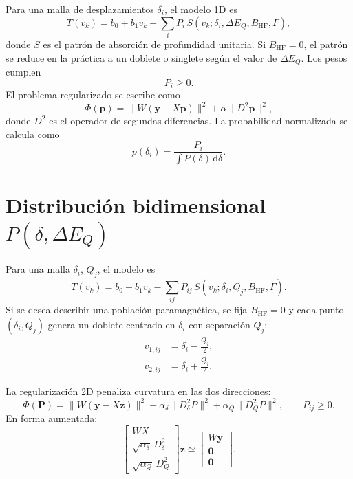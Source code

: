 \documentclass[11pt,a4paper]{article}
\newcommand{\IS}{\delta}
\newcommand{\QS}{\Delta E_Q}
\newcommand{\BHF}{B_{\mathrm{HF}}}
\newcommand{\dd}{\mathrm{d}}
\begin{document}
Para una malla de desplazamientos $\IS_i$, el modelo 1D es
\begin{equation}
  T(v_k)=b_0+b_1v_k-\sum_i P_i\,S(v_k;\IS_i,\QS,\BHF,\Gamma),
\end{equation}
donde $S$ es el patrón de absorción de profundidad unitaria. Si $\BHF=0$, el
patrón se reduce en la práctica a un doblete o singlete según el valor de $\QS$.
Los pesos cumplen
\begin{equation}
  P_i\ge0.
\end{equation}
El problema regularizado se escribe como
\begin{equation}
  \Phi(\bm p)=\|W(\bm y-X\bm p)\|^2+\alpha\|D^2\bm p\|^2,
\end{equation}
donde $D^2$ es el operador de segundas diferencias. La probabilidad normalizada
se calcula como
\begin{equation}
  p(\IS_i)=\frac{P_i}{\int P(\IS)\,\dd\IS}.
\end{equation}

\section{Distribución bidimensional $P(\IS,\QS)$}

Para una malla $\IS_i$, $Q_j$, el modelo es
\begin{equation}
  T(v_k)=b_0+b_1v_k-\sum_{ij}P_{ij}\,
  S(v_k;\IS_i,Q_j,\BHF,\Gamma).
\end{equation}
Si se desea describir una población paramagnética, se fija $\BHF=0$ y cada punto
$(\IS_i,Q_j)$ genera un doblete centrado en $\IS_i$ con separación $Q_j$:
\begin{align}
  v_{1,ij}&=\IS_i-\frac{Q_j}{2},\\
  v_{2,ij}&=\IS_i+\frac{Q_j}{2}.
\end{align}

La regularización 2D penaliza curvatura en las dos direcciones:
\begin{equation}
  \Phi(\bm P)=\|W(\bm y-X\bm z)\|^2
  +\alpha_{\IS}\|D_{\IS}^2P\|^2
  +\alpha_Q\|D_Q^2P\|^2,
  \qquad P_{ij}\ge0.
\end{equation}
En forma aumentada:
\begin{equation}
  \begin{bmatrix}
    WX\\
    \sqrt{\alpha_{\IS}}\,D_{\IS}^2\\
    \sqrt{\alpha_Q}\,D_Q^2
  \end{bmatrix}\bm z\simeq
  \begin{bmatrix}
    W\bm y\\
    \bm 0\\
    \bm 0
  \end{bmatrix}.
\end{equation}
\end{document}
